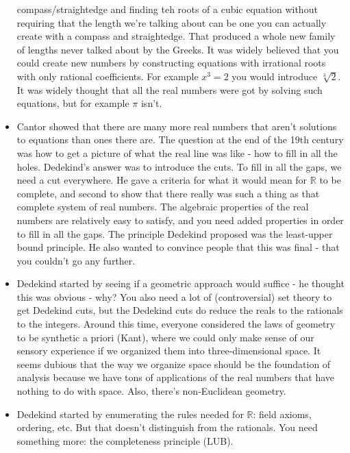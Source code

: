 \documentclass[12pt]{article}
\theoremstyle{definition}
\begin{document}
\begin{itemize}
        compass/straightedge and finding teh roots of a cubic equation without
        requiring that the length we're talking about can be one you can
        actually create with a compass and straightedge. That produced a whole
        new family of lengths never talked about by the Greeks. It was widely
        believed that you could create new numbers by constructing equations
        with irrational roots with only rational coefficients. For example $x^3
        = 2$ you would introduce $\sqrt[3]{2}$. It was widely thought that all
        the real numbers were got by solving such equations, but for example
        $\pi$ isn't.
    \item
        Cantor showed that there are many more real numbers that aren't
        solutions to equations than ones there are. The question at the end of
        the 19th century was how to get a picture of what the real line was
        like - how to fill in all the holes. Dedekind's answer was to introduce
        the cuts. To fill in all the gaps, we need a cut everywhere. He gave a
        criteria for what it would mean for $\mathbb{R}$ to be complete, and
        second to show that there really was such a thing as that complete
        system of real numbers. The algebraic properties of the real numbers
        are relatively easy to satisfy, and you need added properties in order
        to fill in all the gaps. The principle Dedekind proposed was the
        least-upper bound principle. He also wanted to convince people that
        this was final - that you couldn't go any further.
    \item
        Dedekind started by seeing if a geometric approach would suffice - he
        thought this was obvious - why? You also need a lot of (controversial)
        set theory to get Dedekind cuts, but the Dedekind cuts do reduce the
        reals to the rationals to the integers. Around this time, everyone
        considered the laws of geometry to be synthetic a priori (Kant), where
        we could only make sense of our sensory experience if we organized them
        into three-dimensional space. It seems dubious that the way we organize
        space should be the foundation of analysis because we have tons of
        applications of the real numbers that have nothing to do with space.
        Also, there's non-Euclidean geometry.
    \item
        Dedekind started by enumerating the rules needed for $\mathbb{R}$:
        field axioms, ordering, etc. But that doesn't distinguish from the
        rationals. You need something more: the completeness principle (LUB).

\end{itemize}
\end{document}

